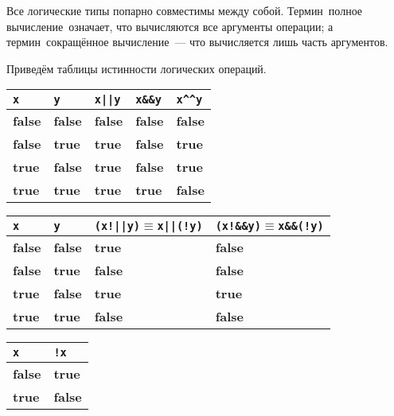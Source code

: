 \documentclass[10pt]{report}
\begin{document}
Все логические типы попарно совместимы между собой. Термин\ \glqq полное вычисление\grqq\ означает, что вычисляются все аргументы операции; а термин\ \glqq сокращённое
вычисление\grqq\ --- что вычисляется лишь часть аргументов.

Приведём таблицы истинности логических операций.
\begin{center}
\vspace{5mm}
\begin{longtable}{|l|l|l|l|l|}  \hline
\texttt{x}          & \texttt{y}        & \texttt{x||y}     & \texttt{x\&\&y}   & \texttt{x\^{ }\^{ }y}   \\  \hline
\textbf{false}       & \textbf{false}     & \textbf{false}     & \textbf{false}     & \textbf{false}         \\  \hline
\textbf{false}       & \textbf{true}   & \textbf{true}   & \textbf{false}     & \textbf{true}       \\  \hline
\textbf{true}     & \textbf{false}     & \textbf{true}   & \textbf{false}     & \textbf{true}       \\  \hline
\textbf{true}     & \textbf{true}   & \textbf{true}   & \textbf{true}   & \textbf{false}        \\  \hline
\end{longtable}

\begin{longtable}{|l|l|l|l|}  \hline
\texttt{x}          & \texttt{y}        & \texttt{(x!||y)$\equiv$x||(!y)}   & \texttt{(x!\&\&y)$\equiv$x\&\&(!y)}   \\  \hline
\textbf{false}       & \textbf{false}     & \textbf{true}                   & \textbf{false}                         \\  \hline
\textbf{false}       & \textbf{true}   & \textbf{false}                     & \textbf{false}                         \\  \hline
\textbf{true}     & \textbf{false}     & \textbf{true}                   & \textbf{true}                       \\  \hline
\textbf{true}     & \textbf{true}   & \textbf{false}                     & \textbf{false}                         \\  \hline
\end{longtable}


\begin{longtable}{|l|l|}  \hline
 \texttt{x}         & \texttt{!x}       \\  \hline
\textbf{false}       & \textbf{true}   \\  \hline
\textbf{true}     & \textbf{false}     \\  \hline
\end{longtable}
\end{center}
\end{document}
